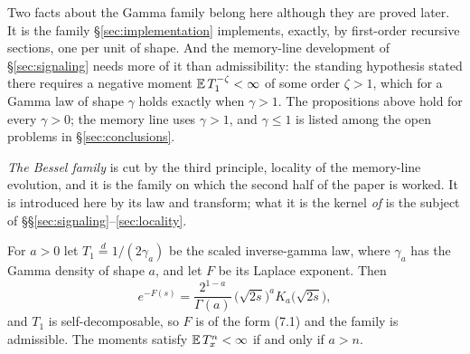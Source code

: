 Two facts about the Gamma family belong here although they are proved later. It is the
family \S\ref{sec:implementation} implements, exactly, by first-order recursive sections, one
per unit of shape. And the memory-line development of \S\ref{sec:signaling} needs more of it
than admissibility: the standing hypothesis stated there requires a negative moment
$\mathbb{E}\,T_1^{-\zeta} < \infty$ of some order $\zeta > 1$, which for a Gamma law of shape $\gamma$
holds exactly when $\gamma > 1$. The propositions above hold for every $\gamma > 0$; the
memory line uses $\gamma > 1$, and $\gamma \le 1$ is listed among the open problems in
\S\ref{sec:conclusions}.

\emph{The Bessel family} is cut by the third principle, locality of the memory-line
evolution, and it is the family on which the second half of the paper is worked. It is
introduced here by its law and transform; what it is the kernel \emph{of} is the subject of
\S\S\ref{sec:signaling}--\ref{sec:locality}.

\begin{proposition}\label{prop:bessel-family}
For $a > 0$ let $T_1 \stackrel{d}{=} 1/(2\gamma_a)$ be the scaled inverse-gamma law, where
$\gamma_a$ has the Gamma density of shape $a$, and let $F$ be its Laplace exponent. Then
\[
  e^{-F(s)} = \frac{2^{1-a}}{\Gamma(a)}\,\bigl(\sqrt{2s}\bigr)^{a} K_a\bigl(\sqrt{2s}\bigr),
\]
and $T_1$ is self-decomposable, so $F$ is of the form (7.1) and the family is admissible. The
moments satisfy $\mathbb{E}\,T_x^n < \infty$ if and only if $a > n$.
\end{proposition}

